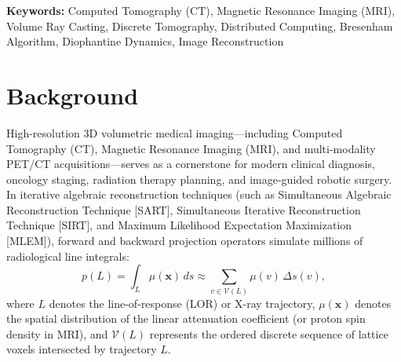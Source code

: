 \documentclass[11pt]{article}
\begin{document}
\vspace{0.2cm}
\noindent \textbf{Keywords:} Computed Tomography (CT), Magnetic Resonance Imaging (MRI), Volume Ray Casting, Discrete Tomography, Distributed Computing, Bresenham Algorithm, Diophantine Dynamics, Image Reconstruction

\newpage

\section*{Background}
\label{sec:background}

High-resolution 3D volumetric medical imaging---including Computed Tomography (CT), Magnetic Resonance Imaging (MRI), and multi-modality PET/CT acquisitions---serves as a cornerstone for modern clinical diagnosis, oncology staging, radiation therapy planning, and image-guided robotic surgery.\cite{feldkamp1984practical,siddon1985fast,jacobs1998fast,long2010separable,kim2024heterogeneous,zhang2023distributed,wang2025distributed,liu2026ultra} In iterative algebraic reconstruction techniques (such as Simultaneous Algebraic Reconstruction Technique [SART], Simultaneous Iterative Reconstruction Technique [SIRT], and Maximum Likelihood Expectation Maximization [MLEM]), forward and backward projection operators simulate millions of radiological line integrals:
\begin{equation}
    \label{eq:radon_integral}
    p(L) = \int_L \mu(\mathbf{x}) \, ds \approx \sum_{v \in \mathcal{V}(L)} \mu(v) \, \Delta s(v),
\end{equation}
where $L$ denotes the line-of-response (LOR) or X-ray trajectory, $\mu(\mathbf{x})$ denotes the spatial distribution of the linear attenuation coefficient (or proton spin density in MRI), and $\mathcal{V}(L)$ represents the ordered discrete sequence of lattice voxels intersected by trajectory $L$.\cite{siddon1985fast,li2020gpu,chen2023exact,muller2025gecco}
\end{document}
